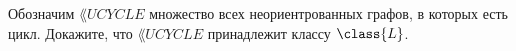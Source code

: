Обозначим $\lang{UCYCLE}$ множество всех неориентрованных графов, в которых есть цикл. Докажите, что $\lang{UCYCLE}$
принадлежит классу $\class{L}$.